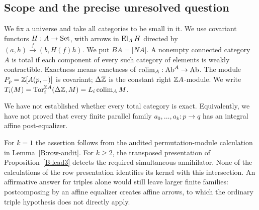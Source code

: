 \subsection{Scope and the precise unresolved question}
We fix a universe and take all categories to be small in it. We use
covariant functors $H:A\to\mathrm{Set}$, with arrows in $\operatorname{El}_AH$ directed by
$(a,h)\xrightarrow{f}(b,H(f)h)$. We put $BA=|NA|$. A nonempty connected
category $A$ is total if each component of every such category of
elements is weakly contractible. Exactness means exactness of
$\operatorname*{colim}_A:\mathrm{Ab}^A\to\mathrm{Ab}$. The module $P_p=\mathbb Z[A(p,-)]$ is covariant;
$\Delta\mathbb Z$ is the constant right $\mathbb Z A$-module. We write
$T_i(M)=\operatorname{Tor}_i^{\mathbb Z A}(\Delta\mathbb Z,M)=L_i\operatorname*{colim}_A M$.

\begin{obstruction}\label{A:main}
We have not established whether every total category is exact. Equivalently,
we have not proved that every finite parallel family
$a_0,\ldots,a_k:p\to q$ has an integral affine post-equalizer.
\end{obstruction}
For $k=1$ the assertion follows from the audited permutation-module
calculation in Lemma~\ref{B:row-audit}. For $k\geq2$, the transposed
presentation of Proposition~\ref{B:lead3} detects the required
simultaneous annihilator. None of the calculations of the row
presentation identifies its kernel with this intersection. An affirmative
answer for triples alone would still leave larger finite families:
postcomposing by an affine equalizer creates affine arrows, to which the
ordinary triple hypothesis does not directly apply.

